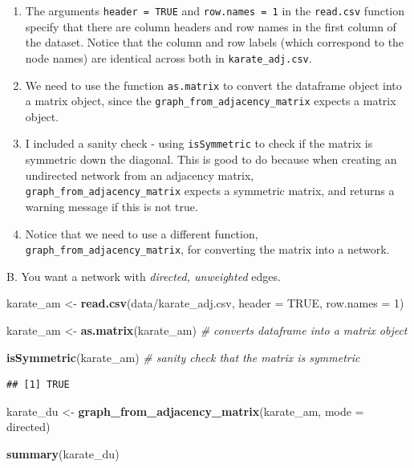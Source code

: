 \documentclass[
]{book}
\newenvironment{Shaded}{\begin{snugshade}}{\end{snugshade}}
\newcommand{\AttributeTok}[1]{\textcolor[rgb]{0.13,0.29,0.53}{#1}}
\newcommand{\CommentTok}[1]{\textcolor[rgb]{0.56,0.35,0.01}{\textit{#1}}}
\newcommand{\ConstantTok}[1]{\textcolor[rgb]{0.56,0.35,0.01}{#1}}
\newcommand{\DecValTok}[1]{\textcolor[rgb]{0.00,0.00,0.81}{#1}}
\newcommand{\FunctionTok}[1]{\textcolor[rgb]{0.13,0.29,0.53}{\textbf{#1}}}
\newcommand{\NormalTok}[1]{#1}
\newcommand{\OtherTok}[1]{\textcolor[rgb]{0.56,0.35,0.01}{#1}}
\newcommand{\StringTok}[1]{\textcolor[rgb]{0.31,0.60,0.02}{#1}}
\providecommand{\tightlist}{%
  \setlength{\itemsep}{0pt}\setlength{\parskip}{0pt}}
\begin{document}
\begin{enumerate}
\def\labelenumi{\arabic{enumi}.}
\tightlist
\item
  The arguments \texttt{header\ =\ TRUE} and \texttt{row.names\ =\ 1} in the \texttt{read.csv} function specify that there are column headers and row names in the first column of the dataset. Notice that the column and row labels (which correspond to the node names) are identical across both in \texttt{karate\_adj.csv}.
\item
  We need to use the function \texttt{as.matrix} to convert the dataframe object into a matrix object, since the \texttt{graph\_from\_adjacency\_matrix} expects a matrix object.
\item
  I included a sanity check - using \texttt{isSymmetric} to check if the matrix is symmetric down the diagonal. This is good to do because when creating an undirected network from an adjacency matrix, \texttt{graph\_from\_adjacency\_matrix} expects a symmetric matrix, and returns a warning message if this is not true.
\item
  Notice that we need to use a different function, \texttt{graph\_from\_adjacency\_matrix}, for converting the matrix into a network.
\end{enumerate}

B. You want a network with \emph{directed, unweighted} edges.

\begin{Shaded}
\begin{Highlighting}[]
\NormalTok{karate\_am }\OtherTok{\textless{}{-}} \FunctionTok{read.csv}\NormalTok{(}\StringTok{\textquotesingle{}data/karate\_adj.csv\textquotesingle{}}\NormalTok{, }\AttributeTok{header =} \ConstantTok{TRUE}\NormalTok{, }\AttributeTok{row.names =} \DecValTok{1}\NormalTok{)}

\NormalTok{karate\_am }\OtherTok{\textless{}{-}} \FunctionTok{as.matrix}\NormalTok{(karate\_am) }\CommentTok{\# converts dataframe into a matrix object}

\FunctionTok{isSymmetric}\NormalTok{(karate\_am) }\CommentTok{\# sanity check that the matrix is symmetric }
\end{Highlighting}
\end{Shaded}

\begin{verbatim}
## [1] TRUE
\end{verbatim}

\begin{Shaded}
\begin{Highlighting}[]
\NormalTok{karate\_du }\OtherTok{\textless{}{-}} \FunctionTok{graph\_from\_adjacency\_matrix}\NormalTok{(karate\_am, }\AttributeTok{mode =} \StringTok{\textquotesingle{}directed\textquotesingle{}}\NormalTok{)}

\FunctionTok{summary}\NormalTok{(karate\_du)}
\end{Highlighting}
\end{Shaded}
\end{document}
